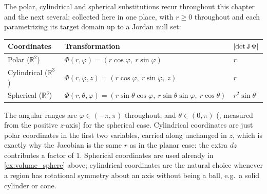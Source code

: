 \begin{remark}
\label{rem:coordinate_jacobians_table}
The polar, cylindrical and spherical substitutions recur throughout this chapter and the next
several; collected here in one place, with $r \geq 0$ throughout and each parametrizing its
target domain up to a Jordan null set:
\begin{center}
\begin{tabular}{@{}lll@{}}
\toprule
\textbf{Coordinates} & \textbf{Transformation} & $\lvert\det\operatorname{J}\Phi\rvert$ \\
\midrule
Polar ($\mathbb{R}^2$) &
  $\Phi(r,\varphi) = (r\cos\varphi,\ r\sin\varphi)$ & $r$ \\
Cylindrical ($\mathbb{R}^3$) &
  $\Phi(r,\varphi,z) = (r\cos\varphi,\ r\sin\varphi,\ z)$ & $r$ \\
Spherical ($\mathbb{R}^3$) &
  $\Phi(r,\theta,\varphi) = (r\sin\theta\cos\varphi,\ r\sin\theta\sin\varphi,\ r\cos\theta)$
  & $r^2\sin\theta$ \\
\bottomrule
\end{tabular}
\end{center}
The angular ranges are $\varphi \in (-\pi,\pi)$ throughout, and $\theta \in (0,\pi)$
(, measured from the positive $z$-axis) for the spherical case. Cylindrical
coordinates are just polar coordinates in the first two variables, carried along unchanged in
$z$, which is exactly why the Jacobian is the same $r$ as in the planar case: the extra $dz$
contributes a factor of $1$. Spherical coordinates are used already in
\cref{ex:volume_sphere} above; cylindrical coordinates are the natural choice whenever a region
has rotational symmetry about an axis without being a ball, e.g.\ a solid cylinder or cone.
\end{remark}

